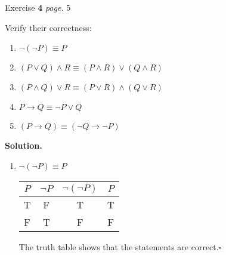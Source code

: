 \documentclass[11pt]{article}
\newcommand{\problem
}[2]{
\begin{mdframed}
    Exercise \textbf{#1} \hfill \emph{page. }#2
\end{mdframed}
}
\begin{document}
\problem{4}{5}
Verify their correctness:
\begin{enumerate}
	\item $\neg(\neg P) \equiv P$
	\item $(P \lor Q) \land R \equiv (P \land R) \lor (Q \land R)$
	\item $(P \land Q) \lor R \equiv (P \lor R) \land (Q \lor R)$
	\item $P  \rightarrow Q \equiv \neg P \lor Q$
	\item $(P \rightarrow Q) \equiv (\neg Q \rightarrow \neg P)$
\end{enumerate}
\textbf{Solution. }
\begin{enumerate}
	\item $\neg(\neg P) \equiv P$
	      \begin{center}
		      \begin{tabular}{|c|c|c|c|}
			      \hline
			      $P$ & $\neg P$ & $\neg(\neg P)$ & $P$ \\
			      \hline
			      T   & F        & T              & T   \\
			      F   & T        & F              & F   \\
			      \hline
		      \end{tabular}
	      \end{center}
	      The truth table shows that the statements are correct.\qquad $\square$


\end{enumerate}
\end{document}
